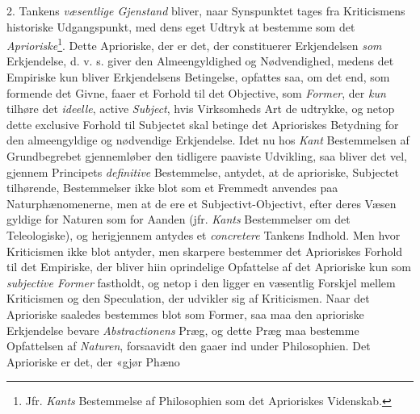 2. Tankens \emph{væsentlige Gjenstand} bliver, naar Synspunktet
tages fra Kriticismens historiske Udgangspunkt, med
dens eget Udtryk at bestemme som det \emph{Aprioriske}\footnote{Jfr. \emph{Kants} Bestemmelse af Philosophien som det Aprioriskes Videnskab.}. Dette
Aprioriske, der er det, der constituerer Erkjendelsen \emph{som} Erkjendelse,
d. v. s. giver den Almeengyldighed og Nødvendighed,
medens det Empiriske kun bliver Erkjendelsens Betingelse,
opfattes saa, om det end, som formende det Givne, faaer et
Forhold til det Objective, som \emph{Former}, der \emph{kun} tilhøre det
\emph{ideelle}, active \emph{Subject}, hvis Virksomheds Art de udtrykke,
og netop dette exclusive Forhold til Subjectet skal betinge det
Aprioriskes Betydning for den almeengyldige og nødvendige
Erkjendelse. Idet nu hos \emph{Kant} Bestemmelsen af Grundbegrebet
gjennemløber den tidligere paaviste Udvikling, saa bliver
det vel, gjennem Principets \emph{definitive} Bestemmelse, antydet,
at de aprioriske, Subjectet tilhørende, Bestemmelser ikke blot
som et Fremmedt anvendes paa Naturphænomenerne, men at
de ere et Subjectivt-Objectivt, efter deres Væsen gyldige for
Naturen som for Aanden (jfr. \emph{Kants} Bestemmelser om det
Teleologiske), og herigjennem antydes et \emph{concretere} Tankens
Indhold. Men hvor Kriticismen ikke blot antyder, men skarpere
bestemmer det Aprioriskes Forhold til det Empiriske, der
bliver hiin oprindelige Opfattelse af det Aprioriske kun som
\emph{subjective Former} fastholdt, og netop i den ligger en væsentlig
Forskjel mellem Kriticismen og den Speculation, der
udvikler sig af Kriticismen. Naar det Aprioriske saaledes
bestemmes blot som Former, saa maa den aprioriske Erkjendelse
bevare \emph{Abstractionens} Præg, og dette Præg maa bestemme
Opfattelsen af \emph{Naturen}, forsaavidt den gaaer ind
under Philosophien. Det Aprioriske er det, der «gjør Phæno
 \setcounter{footnote}{0}

